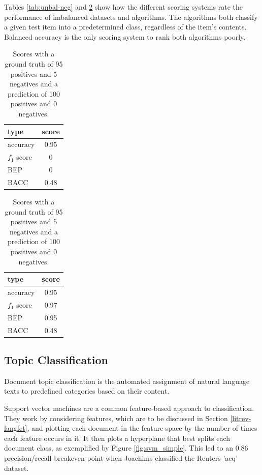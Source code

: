 			Tables \ref{tab:unbal-neg} and \ref{tab:unbal-pos} show how the different scoring systems rate the performance of imbalanced datasets and algorithms. The algorithms both classify a given test item into a predetermined class, regardless of the item's contents. Balanced accuracy is the only scoring system to rank both algorithms poorly.
			
			\begin{table}
				\parbox{.45\linewidth}{
					\centering
					\begin{tabular}{l|c}
						\hline
						type&score\\
						\hline
						accuracy&0.95\\
						$f_1$ score&0\\
						BEP&0\\
						BACC&0.48
					\end{tabular}
					\caption{Scores with a ground truth of 5 positives and 95 negatives and a prediction of 0 positives and 100 negatives.}\label{tab:unbal-neg}
				}
				\hfill
				\parbox{.45\linewidth}{
					\centering
					\begin{tabular}{l|c}
						\hline
						type&score\\
						\hline
						accuracy&0.95\\
						$f_1$ score&0.97\\
						BEP&0.95\\
						BACC&0.48
					\end{tabular}
					\caption{Scores with a ground truth of 95 positives and 5 negatives and a prediction of 100 positives and 0 negatives.}\label{tab:unbal-pos}
				}
			\end{table}
		\subsection{Topic Classification}\label{ssec:topclas}
			Document topic classification is the automated assignment of natural language texts to predefined categories based on their content\cite{ml_automated_sebastiani}.  

			Support vector machines are a common feature-based approach to classification. They work by considering features, which are to be discussed in Section \ref{litrev-langfet}, and plotting each document in the feature space by the number of times each feature occurs in it. It then plots a hyperplane that best splits each document class, as exemplified by Figure \ref{fig:svm_simple}. This led to an 0.86 precision/recall breakeven point when Joachims classified the Reuters 'acq' dataset\cite{svm_joachims}.  

